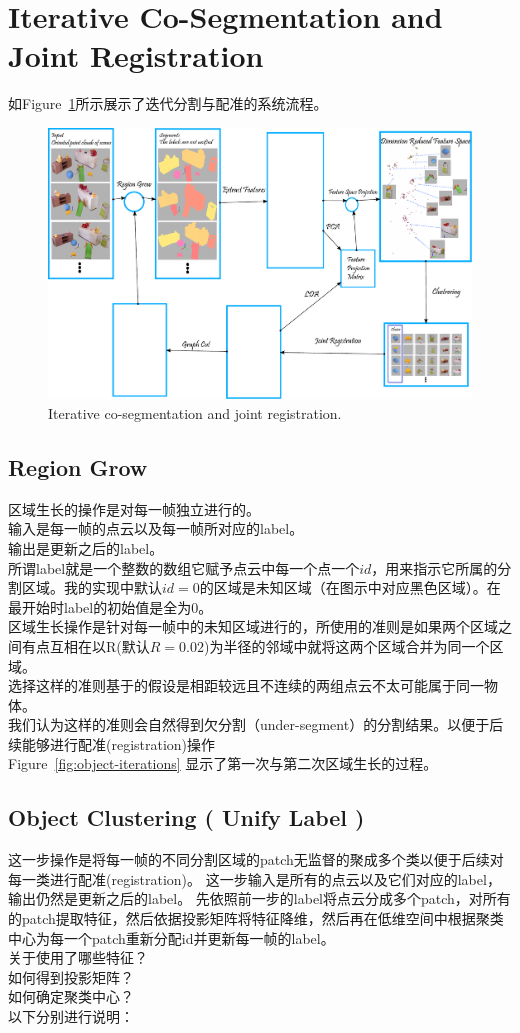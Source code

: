 \section{Iterative Co-Segmentation and Joint Registration}
\label{sec:segmentation}
如Figure~\ref{fig:iterative-segmentation-registration}所示展示了迭代分割与配准的系统流程。
\begin{figure}
	\includegraphics[width=1.0\textwidth]{figures/hsy/overview}
	\caption{Iterative co-segmentation and joint registration.}
	\label{fig:iterative-segmentation-registration}
\end{figure}
\subsection{Region Grow}
区域生长的操作是对每一帧独立进行的。\\
输入是每一帧的点云以及每一帧所对应的label。\\
输出是更新之后的label。 \\
所谓label就是一个整数的数组它赋予点云中每一个点一个$id$，用来指示它所属的分割区域。我的实现中默认$id=0$的区域是未知区域（在图示中对应黑色区域）。在最开始时label的初始值是全为0。\\
区域生长操作是针对每一帧中的未知区域进行的，所使用的准则是如果两个区域之间有点互相在以R(默认$R=0.02$)为半径的邻域中就将这两个区域合并为同一个区域。\\
选择这样的准则基于的假设是相距较远且不连续的两组点云不太可能属于同一物体。\\
我们认为这样的准则会自然得到欠分割（under-segment）的分割结果。以便于后续能够进行配准(registration)操作\\
Figure~\ref{fig:object-iterations} 显示了第一次与第二次区域生长的过程。
\subsection{Object Clustering ( Unify Label )}
这一步操作是将每一帧的不同分割区域的patch无监督的聚成多个类以便于后续对每一类进行配准(registration)。
这一步输入是所有的点云以及它们对应的label，输出仍然是更新之后的label。
先依照前一步的label将点云分成多个patch，对所有的patch提取特征，然后依据投影矩阵将特征降维，然后再在低维空间中根据聚类中心为每一个patch重新分配id并更新每一帧的label。\\
关于使用了哪些特征？\\
如何得到投影矩阵？\\
如何确定聚类中心？\\
以下分别进行说明：
